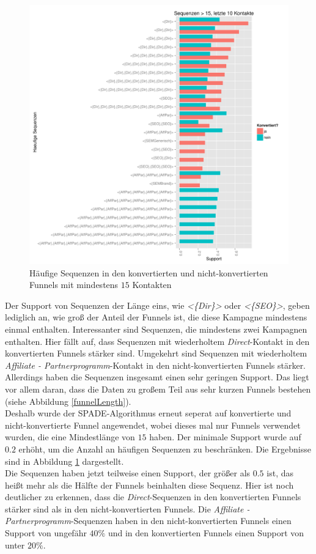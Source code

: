 \begin{figure}[H]
	\centering\includegraphics[scale=0.6]{spm_min15.pdf}\caption[Häufige Sequenzen in Funnels mit mindestens $15$ Kontaktpunkten]{Häufige Sequenzen in den konvertierten und nicht-konvertierten Funnels mit mindestens $15$ Kontakten}\label{spm_min15}
\end{figure}
\noindent Der Support von Sequenzen der Länge eins, wie \textit{<\{Dir\}>} oder \textit{<\{SEO\}>}, geben lediglich an, wie groß der Anteil der Funnels ist, die diese Kampagne mindestens einmal enthalten. Interessanter sind Sequenzen, die mindestens zwei Kampagnen enthalten. Hier fällt auf, dass Sequenzen mit wiederholtem \textit{Direct}-Kontakt in den konvertierten Funnels stärker sind. Umgekehrt sind  Sequenzen mit wiederholtem \textit{Affiliate - Partnerprogramm}-Kontakt in den nicht-konvertierten Funnels stärker. Allerdings haben die Sequenzen insgesamt einen sehr geringen Support. Das liegt vor allem daran, dass die Daten zu großem Teil aus sehr kurzen Funnels bestehen (siehe Abbildung \ref{funnelLength}).\\
Deshalb wurde der SPADE-Algorithmus erneut seperat auf konvertierte und nicht-konvertierte Funnel angewendet, wobei dieses mal nur Funnels verwendet wurden, die eine Mindestlänge von $15$ haben. Der minimale Support wurde auf $0.2$ erhöht, um die Anzahl an häufigen Sequenzen zu beschränken. Die Ergebnisse sind in Abbildung \ref{spm_min15} dargestellt.\\
Die Sequenzen haben jetzt teilweise einen Support, der größer als $0.5$ ist, das heißt mehr als die Hälfte der Funnels beinhalten diese Sequenz. Hier ist noch deutlicher zu erkennen, dass die \textit{Direct}-Sequenzen in den konvertierten Funnels stärker sind als in den nicht-konvertierten Funnels. Die \textit{Affiliate - Partnerprogramm}-Sequenzen haben in den nicht-konvertierten Funnels einen Support von ungefähr $40 \%$ und in den konvertierten Funnels einen Support von unter $20 \%$.\\

